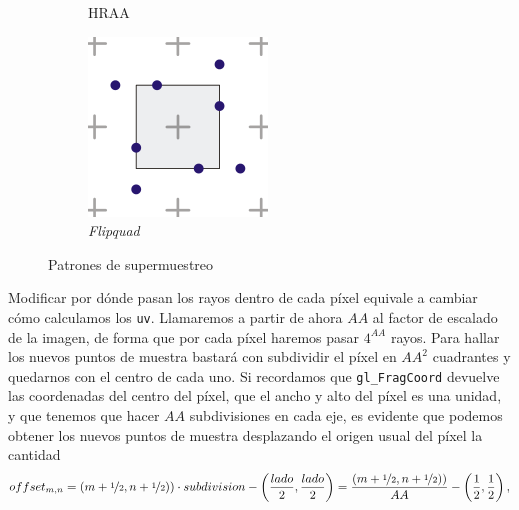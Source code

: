 \begin{figure}[htbp]
\begin{subfigure}[b]{0.25\textwidth}
        \caption{HRAA}
    \end{subfigure}
    \hfill
    \begin{subfigure}[b]{0.25\textwidth}
        \centering
        \includegraphics[width=\textwidth]{Plantilla-TFG-master/img/aa6.png}
        \caption{\textit{Flipquad}}
    \end{subfigure}
    \caption{Patrones de supermuestreo \cite{supersamp}}
    \label{fig:patrones}
\end{figure}

Modificar por dónde pasan los rayos dentro de cada píxel equivale a cambiar cómo calculamos los \texttt{uv}. Llamaremos a partir de ahora $AA$ al factor de escalado de la imagen, de forma que por cada píxel haremos pasar $4^{AA}$ rayos. Para hallar los nuevos puntos de muestra bastará con subdividir el píxel en $AA^2$ cuadrantes y quedarnos con el centro de cada uno. Si recordamos que \texttt{gl\_FragCoord} devuelve las coordenadas del centro del píxel, que el ancho y alto del píxel es una unidad, y que tenemos que hacer $AA$ subdivisiones en cada eje, es evidente que podemos obtener los nuevos puntos de muestra desplazando el origen usual del píxel la cantidad
\begin{equation*}
    offset_{m,n} = (m+\nicefrac{1}{2},n+\nicefrac{1}{2}))\cdot subdivision - \left( \frac{lado}{2}, \frac{lado}{2}\right) = \frac{ (m+\nicefrac{1}{2},n+\nicefrac{1}{2}))}{AA} - \left( \frac{1}{2}, \frac{1}{2}\right),
\end{equation*}

